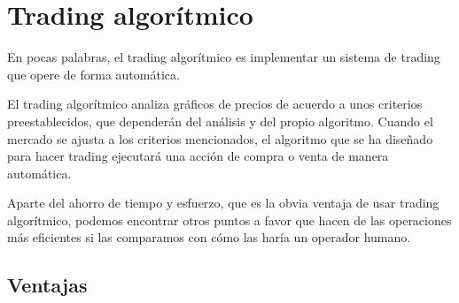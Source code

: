 \section{Trading algorítmico}

En pocas palabras, el trading algorítmico es implementar un sistema de trading que opere de forma automática. \newline

El trading algorítmico analiza gráficos de precios de acuerdo a unos criterios preestablecidos, que dependerán del análisis y del propio algoritmo. Cuando el mercado se ajusta a los criterios mencionados, el algoritmo que se ha diseñado para hacer trading ejecutará una acción de compra o venta de manera automática. \newline

Aparte del ahorro de tiempo y esfuerzo, que es la obvia ventaja de usar trading algorítmico, podemos encontrar otros puntos a favor que hacen de las operaciones más eficientes si las comparamos con cómo las haría un operador humano. \newline

\subsection{Ventajas}

